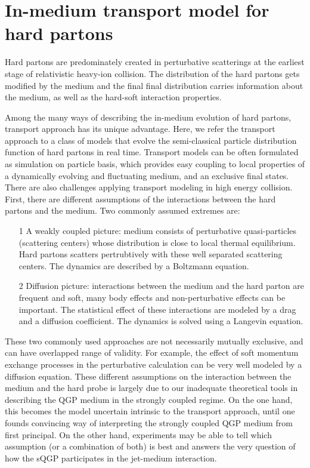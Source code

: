 \chapter{In-medium transport model for hard partons}
Hard partons are predominately created in perturbative scatterings at the earliest stage of relativistic heavy-ion collision.
The distribution of the hard partons gets modified by the medium and the final final distribution carries information about the medium, as well as the hard-soft interaction properties.

Among the many ways of describing the in-medium evolution of hard partons, 
transport approach has its unique advantage. 
Here, we refer the transport approach to a class of models that evolve the semi-classical particle distribution function of hard partons in real time.
Transport models can be often formulated as simulation on particle basis, which provides easy coupling to local properties of a dynamically evolving and fluctuating medium, and an exclusive final states.
There are also challenges applying transport modeling in high energy collision.
First, there are different assumptions of the interactions between the hard partons and the medium.
Two commonly assumed extremes are:
\begin{itemize}
\item[1] A weakly coupled picture: medium consists of perturbative quasi-particles (scattering centers) whose distribution is close to local thermal equilibrium.
Hard partons scatters pertrubtively with these well separated scattering centers. The dynamics are described by a Boltzmann equation.
\item[2] Diffusion picture: interactions between the medium and the hard parton are frequent and soft, many body effects and non-perturbative effects can be important. The statistical effect of these interactions are modeled by a drag and a diffusion coefficient. The dynamics is solved using a Langevin equation.
\end{itemize}
These two commonly used approaches are not necessarily mutually exclusive, and can have overlapped range of validity. 
For example, the effect of soft momentum exchange processes in the perturbative calculation can be very well modeled by a diffusion equation.
These different assumptions on the interaction between the medium and the hard probe is largely due to our inadequate theoretical tools in describing the QGP medium in the strongly coupled regime.
On the one hand, this becomes the model uncertain intrinsic to the transport approach, until one founds convincing way of interpreting the strongly coupled QGP medium from first principal.
On the other hand, experiments may be able to tell which assumption (or a combination of both) is best and answers the very question of how the sQGP participates in the jet-medium interaction.

